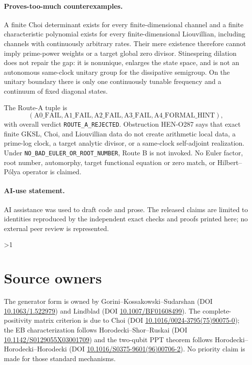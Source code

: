 \documentclass[10pt]{article}
\providecommand{\CRevisionRound}{2}
\begin{document}
\paragraph{Proves-too-much counterexamples.}
A finite Choi determinant exists for every finite-dimensional channel and a
finite characteristic polynomial exists for every finite-dimensional
Liouvillian, including channels with continuously arbitrary rates.  Their mere
existence therefore cannot imply prime-power weights or a target global zero
divisor.  Stinespring dilation does not repair the gap: it is nonunique,
enlarges the state space, and is not an autonomous same-clock unitary group for
the dissipative semigroup.  On the unitary boundary there is only one
continuously tunable frequency and a continuum of fixed diagonal states.

The Route-A tuple is
\[
 (\mathrm{A0\_FAIL},\mathrm{A1\_FAIL},\mathrm{A2\_FAIL},
   \mathrm{A3\_FAIL},\mathrm{A4\_FORMAL\_HINT}),
\]
with overall verdict \texttt{ROUTE\_A\_REJECTED}.  Obstruction HEN-O287 says
that exact finite GKSL, Choi, and Liouvillian data do not create arithmetic
local data, a prime-log clock, a target analytic divisor, or a same-clock
self-adjoint realization.  Under \texttt{NO\_BAD\_EULER\_OR\_ROOT\_NUMBER},
Route B is not invoked.  No Euler factor, root number, automorphy, target
functional equation or zero match, or Hilbert--P\'olya operator is claimed.

\paragraph{AI-use statement.}
AI assistance was used to draft code and prose.  The released claims are
limited to identities reproduced by the independent exact checks and proofs
printed here; no external peer review is represented.
\fi

\ifnum\CRevisionRound>1\enlargethispage{3\baselineskip}\fi
\section*{Source owners}
The generator form is owned by Gorini--Kossakowski--Sudarshan
(DOI \href{https://doi.org/10.1063/1.522979}{10.1063/1.522979}) and Lindblad
(DOI \href{https://doi.org/10.1007/BF01608499}{10.1007/BF01608499}).
The complete-positivity matrix criterion is due to Choi
(DOI \href{https://doi.org/10.1016/0024-3795(75)90075-0}{10.1016/0024-3795(75)90075-0});
the EB characterization follows Horodecki--Shor--Ruskai
(DOI \href{https://doi.org/10.1142/S0129055X03001709}{10.1142/S0129055X03001709})
and the two-qubit PPT theorem follows Horodecki--Horodecki--Horodecki
(DOI \href{https://doi.org/10.1016/S0375-9601(96)00706-2}{10.1016/S0375-9601(96)00706-2}).
No priority claim is made for those standard mechanisms.
\end{document}
